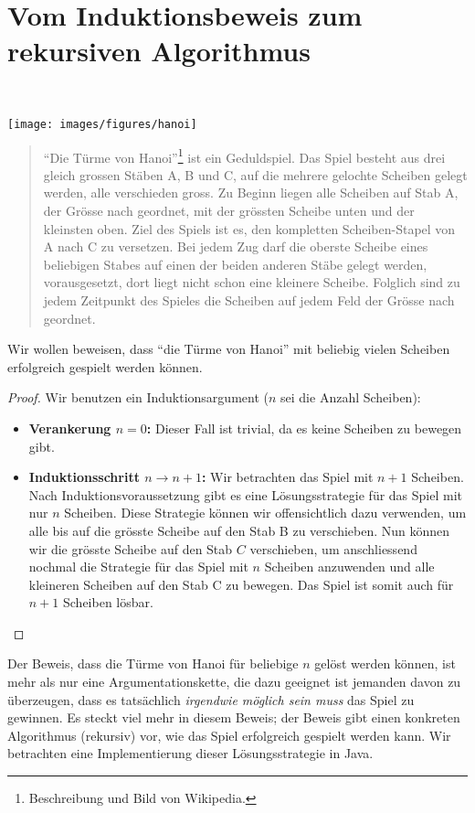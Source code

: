 \section{Vom Induktionsbeweis zum rekursiven Algorithmus}

\begin{bsp}~
\begin{center}
\texttt{[image: images/figures/hanoi]}
\end{center}
\begin{quote}
``Die Türme von Hanoi''\footnote{Beschreibung und Bild von Wikipedia.} ist ein Geduldspiel. Das Spiel besteht aus drei gleich grossen Stäben A, B und C, auf die mehrere gelochte Scheiben gelegt werden, alle verschieden gross. Zu Beginn liegen alle Scheiben auf Stab A, der Grösse nach geordnet, mit der grössten Scheibe unten und der kleinsten oben. Ziel des Spiels ist es, den kompletten Scheiben-Stapel von A nach C zu versetzen.
Bei jedem Zug darf die oberste Scheibe eines beliebigen Stabes auf einen der beiden anderen Stäbe gelegt werden, vorausgesetzt, dort liegt nicht schon eine kleinere Scheibe. Folglich sind zu jedem Zeitpunkt des Spieles die Scheiben auf jedem Feld der Grösse nach geordnet.
\end{quote}
Wir wollen beweisen, dass ``die Türme von Hanoi'' mit beliebig vielen Scheiben erfolgreich gespielt werden können.
\begin{proof} Wir benutzen ein Induktionsargument ($n$ sei die Anzahl Scheiben):
\begin{itemize}
\item \textbf{Verankerung $n=0$:} Dieser Fall ist trivial, da es keine Scheiben zu bewegen gibt.
\item \textbf{Induktionsschritt $n\to n+1$:} Wir betrachten das Spiel mit $n+1$ Scheiben. Nach Induktionsvoraussetzung gibt es eine Lösungsstrategie für das Spiel mit nur $n$ Scheiben. Diese Strategie können wir offensichtlich dazu verwenden, um alle bis auf die grösste Scheibe auf den Stab B zu verschieben. Nun können wir die grösste Scheibe auf den Stab $C$ verschieben, um anschliessend nochmal die Strategie für das Spiel mit $n$ Scheiben anzuwenden und alle kleineren Scheiben auf den Stab C zu bewegen. Das Spiel ist somit auch für $n+1$ Scheiben lösbar. \qedhere
\end{itemize}
\end{proof}
\begin{rk}
Der Beweis, dass die Türme von Hanoi für beliebige $n$ gelöst werden können, ist mehr als nur eine Argumentationskette, die dazu geeignet ist jemanden davon zu überzeugen, dass es tatsächlich \textit{irgendwie möglich sein muss} das Spiel zu gewinnen. Es steckt viel mehr in diesem Beweis; der Beweis gibt einen konkreten Algorithmus (rekursiv) vor, wie das Spiel erfolgreich gespielt werden kann. Wir betrachten eine Implementierung dieser Lösungsstrategie in Java.



\end{rk}
\end{bsp}

